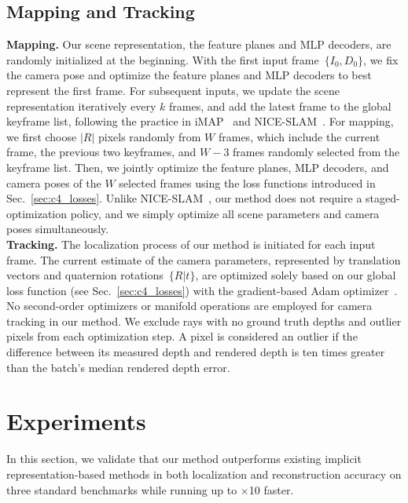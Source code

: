 \subsection{Mapping and Tracking} \label{sec:c4_map_track}
\noindent\textbf{Mapping.} Our scene representation, \ie the feature planes and MLP decoders, are randomly initialized at the beginning. With the first input frame~$\{I_{0}, D_{0}\}$, we fix the camera pose and optimize the feature planes and MLP decoders to best represent the first frame. For subsequent inputs, we update the scene representation iteratively every $k$ frames, and add the latest frame to the global keyframe list, following the practice in iMAP~\cite{sucar2021imap} and NICE-SLAM~\cite{zhu2022nice}. For mapping, we first choose $|R|$ pixels randomly from $W$ frames, which include the current frame, the previous two keyframes, and $W - 3$ frames randomly selected from the keyframe list. Then, we jointly optimize the feature planes, MLP decoders, and camera poses of the $W$ selected frames using the loss functions introduced in Sec.~\ref{sec:c4_losses}. Unlike NICE-SLAM~\cite{zhu2022nice}, our method does not require a staged-optimization policy, and we simply optimize all scene parameters and camera poses simultaneously. \\

\noindent\textbf{Tracking.} The localization process of our method is initiated for each input frame. The current estimate of the camera parameters, represented by translation vectors and quaternion rotations\cite{shoemake1985animating}~$\{R|t\}$, are optimized solely based on our global loss function (see Sec.~\ref{sec:c4_losses}) with the gradient-based Adam optimizer~\cite{adam}. No second-order optimizers or manifold operations are employed for camera tracking in our method. We exclude rays with no ground truth depths and outlier pixels from each optimization step. A pixel is considered an outlier if the difference between its measured depth and rendered depth is ten times greater than the batch's median rendered depth error.

\section{Experiments}
In this section, we validate that our method outperforms existing implicit representation-based methods in both localization and reconstruction accuracy on three standard benchmarks while running up to $\times$10 faster.

